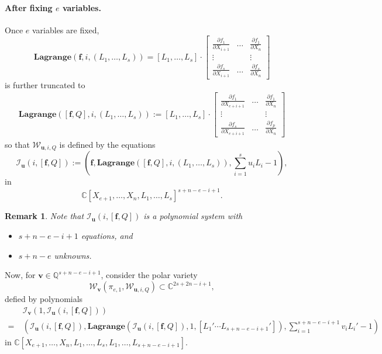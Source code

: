 \documentclass[12pt]{article}
\def\pa{\partial}
\def\C{\mathbb{C}}
\def\lag{{\bm{Lagrange}}}
\newtheorem{remark}[theorem]{Remark}
\def\pa{\partial}
\def\C{\mathbb{C}}
\begin{document}
\paragraph*{After fixing $e$ variables.}
Once $e$ variables are fixed,
\[
\lag(\bm f,i,(L_1,\hdots,L_s)) = 
[L_1,\hdots,L_s]\cdot\left[ 
\begin{array}{ccc}
\frac{\pa f_1}{\pa X_{i+1}}&\hdots& \frac{\pa f_1}{\pa X_{n}} \\
\vdots& &\vdots\\
\frac{\pa f_s}{\pa X_{i+1}}&\hdots& \frac{\pa f_s}{\pa X_{n}} 
\end{array}
\right]
\]
is further truncated to 
\begin{align*}
\lag([\bm f,Q],i,(L_1,\hdots,L_s)) := 
[L_1,\hdots,L_s]\cdot
\left[ 
\begin{array}{ccc}
\frac{\pa f_1}{\pa X_{e+i+1}}&\hdots& \frac{\pa f_1}{\pa X_{n}} \\
\vdots& &\vdots\\
\frac{\pa f_s}{\pa X_{e+i+1}}&\hdots& \frac{\pa f_p}{\pa X_{n}} 
\end{array}
\right]
\end{align*}
so that $\mathscr{W}_{\bm u,i,Q}$ is defined by the equations 
\[
\mathscr{I}_{\bm u}(i,[\bm f,Q]) := \left( \bm f, \lag([\bm f,Q],i,(L_1,\hdots,L_s)), \sum_{i=1}^s u_iL_i-1\right),
\]
in 
\[
\mathbb{C}[X_{e+1},\hdots,X_{n},L_1,\hdots,L_s]^{s+n-e-i+1}. 
\]
%
\begin{remark}
    Note that $\mathscr{I}_{\bm u}(i,[\bm f,Q])$ is a polynomial system with
    \begin{itemize}
        \item $s+n-e-i+1$ equations, and
        \item $s+n-e$ unknowns. 
    \end{itemize}
\end{remark}
%
Now, for $\bm v \in \mathbb{Q}^{s+n-e-i+1}$, consider the polar variety \[\mathscr{W}_{\bm v}(\pi_{e,1},\mathscr{W}_{\bm u,i,Q}) \subset \C^{2s+2n-i+1},\]
defied by polynomials 
\begin{align*}
&\mathscr{I}_{\bm v}(1,\mathscr{I}_{\bm u}(i,[\bm f,Q]))\\ 
=~& 
\left(\mathscr{I}_{\bm u}(i,[\bm f,Q]),\lag(\mathscr{I}_{\bm u}(i,[\bm f,Q]),1,[L_1'\cdots L_{s+n-e-i+1}']),\sum_{i=1}^{s+n-e-i+1}v_iL_i' -1\right) 
\end{align*}
in 
$\C[X_{e+1},\hdots,X_{n},L_1,\hdots,L_{s},L_1,\hdots,L_{s+n-e-i+1}]$. 
\end{document}

